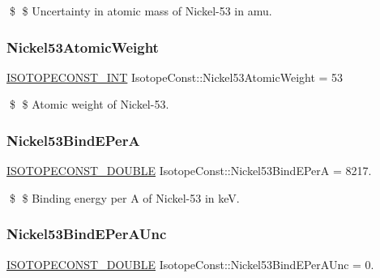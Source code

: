 \$ \$ Uncertainty in atomic mass of Nickel-\/53 in amu. \mbox{\label{group___isotope_const-_nickel-_ni53_ga1d73bb6838c464bc3968c7ae0869be75}} 
\subsubsection{\texorpdfstring{Nickel53\+Atomic\+Weight}{Nickel53AtomicWeight}}
{\footnotesize\ttfamily \mbox{\hyperlink{group___isotope_const-_macros_ga5f18360b3e99483a35c32d789e62621c}{I\+S\+O\+T\+O\+P\+E\+C\+O\+N\+S\+T\+\_\+\+I\+NT}} Isotope\+Const\+::\+Nickel53\+Atomic\+Weight = 53}

\$ \$ Atomic weight of Nickel-\/53. \mbox{\label{group___isotope_const-_nickel-_ni53_gad5ef7374b78a901deacafd8af0dde3b4}} 
\subsubsection{\texorpdfstring{Nickel53\+Bind\+E\+PerA}{Nickel53BindEPerA}}
{\footnotesize\ttfamily \mbox{\hyperlink{group___isotope_const-_macros_ga8f45a7272ce02c0b4c65c44636ed719a}{I\+S\+O\+T\+O\+P\+E\+C\+O\+N\+S\+T\+\_\+\+D\+O\+U\+B\+LE}} Isotope\+Const\+::\+Nickel53\+Bind\+E\+PerA = 8217.}

\$ \$ Binding energy per A of Nickel-\/53 in keV. \mbox{\label{group___isotope_const-_nickel-_ni53_gaacd19cee3d22dc3f0b03cc4bf975ee03}} 
\subsubsection{\texorpdfstring{Nickel53\+Bind\+E\+Per\+A\+Unc}{Nickel53BindEPerAUnc}}
{\footnotesize\ttfamily \mbox{\hyperlink{group___isotope_const-_macros_ga8f45a7272ce02c0b4c65c44636ed719a}{I\+S\+O\+T\+O\+P\+E\+C\+O\+N\+S\+T\+\_\+\+D\+O\+U\+B\+LE}} Isotope\+Const\+::\+Nickel53\+Bind\+E\+Per\+A\+Unc = 0.}

